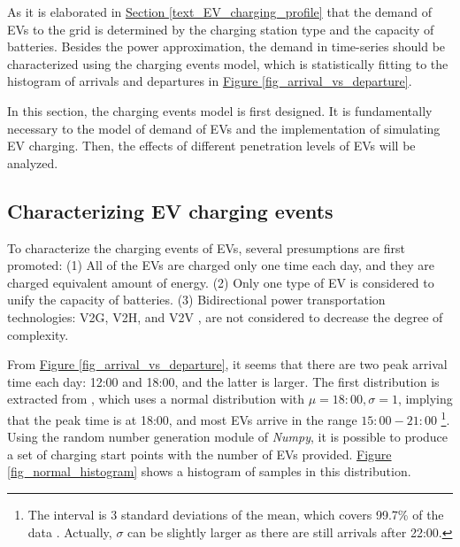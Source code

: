 \documentclass[12pt,a4paper]{report}
\begin{document}
            As it is elaborated in \hyperref[text_EV_charging_profile]{Section \ref*{text_EV_charging_profile}} that the demand of EVs to the grid is determined by the charging station type and the capacity of batteries. Besides the power approximation, the demand in time-series should be characterized using the charging events model, which is statistically fitting to the histogram of arrivals and departures in \hyperref[fig_arrival_vs_departure]{Figure \ref*{fig_arrival_vs_departure}}.

            In this section, the charging events model is first designed. It is fundamentally necessary to the model of demand of EVs and the implementation of simulating EV charging. Then, the effects of different penetration levels of EVs will be analyzed.

                \subsection{Characterizing EV charging events}
                \label{text_ev_charging_model}
                To characterize the charging events of EVs, several presumptions are first promoted: (1) All of the EVs are charged only one time each day, and they are charged equivalent amount of energy. (2) Only one type of EV is considered to unify the capacity of batteries. (3) Bidirectional power transportation technologies: V2G, V2H, and V2V \cite{paper:v2g}, are not considered to decrease the degree of complexity.

                From \hyperref[fig_arrival_vs_departure]{Figure \ref*{fig_arrival_vs_departure}}, it seems that there are two peak arrival time each day: 12:00 and 18:00, and the latter is larger. The first distribution is extracted from \cite{paper:Shao2010}, which uses a normal distribution with $\mu = 18:00, \sigma = 1$, implying that the peak time is at 18:00, and most EVs arrive in the range $15:00 - 21:00$ \footnote{The interval is 3 standard deviations of the mean, which covers 99.7\% of the data \cite{website:normaldistribution}. Actually, $\sigma$ can be slightly larger as there are still arrivals after 22:00.}.
                Using the random number generation module of \emph{Numpy}, it is possible to produce a set of charging start points with the number of EVs provided. \hyperref[fig_normal_histogram]{Figure \ref*{fig_normal_histogram}} shows a histogram of samples in this distribution.
\end{document}
